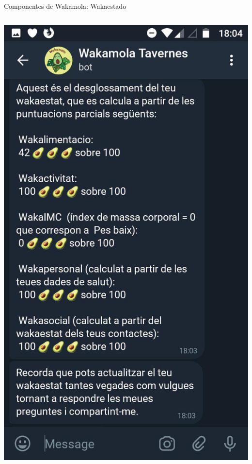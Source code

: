 \documentclass[bigger]{beamer}
\begin{document}
\begin{frame}{Componentes de Wakamola: Wakaestado}
\begin{columns}[T]
		\begin{column}[T]{6cm}
		\centering
		\includegraphics[scale=0.16]{img/wakaestadodetail}
		\end{column}
\end{columns}
\end{frame}
\end{document}
